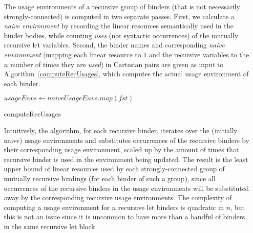 \documentclass[acmsmall, screen, review]{acmart}
\begin{document}
The usage environments of a recursive group of binders (that is not necessarily
strongly-connected) is computed in two separate passes.
%
First, we calculate a \emph{naive environment} by recording the linear
resources semantically used in the binder bodies, while counting \emph{uses}
(not syntactic occurrences) of the mutually recursive let variables.
%
Second, the binder names and corresponding \emph{naive environment} (mapping
each linear resource to $1$ and the recursive variables to the $n$ number of
times they are \emph{used}) in Cartesian pairs are given as input to
Algorithm~\ref{computeRecUsages}, which computes the actual usage environment
of each binder.
%
\begin{algorithm}
$usageEnvs \gets naiveUsageEnvs.map(fst)$\;
\caption{computeRecUsages\label{computeRecUsages}}
\end{algorithm}
%
Intuitively, the algorithm, for each recursive binder, iterates over the
(initially naive) usage environments and substitutes occurrences of the
recursive binders by their corresponding usage environment,
scaled up by the amount of times that recursive binder is used in the
environment being updated. The result is the least upper bound of linear
resources used by each strongly-connected group of mutually recursive bindings
(for each binder of such a group), since all occurrences of the recursive
binders in the usage environments will be substituted away by the corresponding
recursive usage environments.
%
%
%
%
The complexity of computing a usage environment for $n$ recursive let binders
is quadratic in $n$,
but this is not an issue since it is uncommon to have more than a handful of
binders in the same recursive let block.
\end{document}

